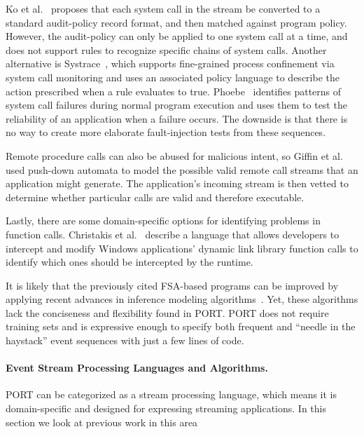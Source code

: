 Ko et al.~\cite{DBLP:conf/acsac/KoFL94} 
proposes that each system call in the
stream be converted to a standard audit-policy record format, and then
matched against program policy.
However, the audit-policy can only be applied to
one system call at a time,
and does not support rules to recognize specific chains of system calls.
Another alternative is
Systrace~\cite{DBLP:conf/uss/Provos03},
which
supports fine-grained process confinement
via system call monitoring and uses an associated policy language 
to describe the action prescribed when a rule evaluates to true.
Phoebe~\cite{DBLP:journals/corr/abs-2006-04444}
identifies patterns of system call failures during normal program execution
and uses them
to test the reliability of an application when a failure occurs.
The downside is that there is no way to create more elaborate fault-injection
tests from these sequences.

Remote procedure calls can also be abused for malicious
intent,
so Giffin et al. ~\cite{DBLP:conf/uss/GiffinJM02} used
push-down automata to model the possible valid
remote call streams that an application might generate.
The application's incoming stream 
is then vetted
to determine whether particular calls are valid and therefore executable.

Lastly, there are some domain-specific options for
identifying problems
in function calls.
Christakis et al.~\cite{DBLP:conf/icse/ChristakisEG017} describe a language that allows developers to intercept and modify
Windows applications’ dynamic link library function calls to identify which ones should be
intercepted by the runtime.

%
It is likely that the previously cited FSA-based programs can be improved by applying recent advances in inference modeling algorithms~\cite{MarianiPS17,WalkinshawTD13,EmamM18,BeschastnikhBEK14}. Yet, these algorithms lack the conciseness and flexibility found in PORT. PORT does not require training sets and is expressive enough to specify both frequent and  “needle in the haystack” event sequences with just a few lines of code.


\paragraph{Event Stream Processing Languages and Algorithms.}
PORT can be categorized as a stream processing language,
which means it is domain-specific and
designed for expressing streaming applications.
In this section we look at previous work in this area


